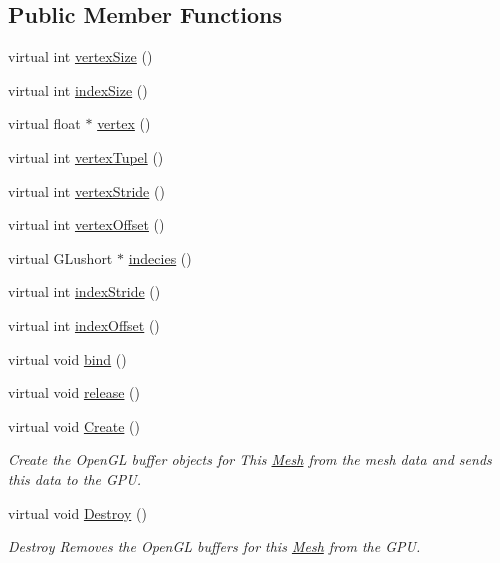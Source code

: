 \subsection*{Public Member Functions}
\begin{DoxyCompactItemize}
\item 
virtual int \hyperlink{class_mesh_a525d8b7c9ff840a0a92c507f0ff2febf}{vertex\+Size} ()
\item 
virtual int \hyperlink{class_mesh_a93afbbcbeaa686dc6a4ae342e842f530}{index\+Size} ()
\item 
virtual float $\ast$ \hyperlink{class_mesh_a7086a32bd045e773e636da12e4f9c1b4}{vertex} ()
\item 
virtual int \hyperlink{class_mesh_a112080d5664bb21790632b7bfcafb4f4}{vertex\+Tupel} ()
\item 
virtual int \hyperlink{class_mesh_abf79b0e9fff121f85f6b2163e8c053f9}{vertex\+Stride} ()
\item 
virtual int \hyperlink{class_mesh_a999026dae1d89c13f5e27a886271d028}{vertex\+Offset} ()
\item 
virtual G\+Lushort $\ast$ \hyperlink{class_mesh_a85b1d83752f168ff75d8327e5dd89df4}{indecies} ()
\item 
virtual int \hyperlink{class_mesh_a1ad488fd8f2d6395f645a127273f0a90}{index\+Stride} ()
\item 
virtual int \hyperlink{class_mesh_abdf32aa39510ff70e9a1d23daebe0c43}{index\+Offset} ()
\item 
virtual void \hyperlink{class_mesh_a8fe3f7dd50c087fe472c0b75ba423974}{bind} ()
\item 
virtual void \hyperlink{class_mesh_a747251d7e9e44fcd7bfd58a89bba7e61}{release} ()
\item 
virtual void \hyperlink{class_mesh_a4e113d785d96bb8b36695469f4c5d862}{Create} ()
\begin{DoxyCompactList}\small\item\em Create the Open\+G\+L buffer objects for This \hyperlink{class_mesh}{Mesh} from the mesh data and sends this data to the G\+P\+U. \end{DoxyCompactList}\item 
virtual void \hyperlink{class_mesh_a969df8ef15def20cfc48c265d194b3c2}{Destroy} ()
\begin{DoxyCompactList}\small\item\em Destroy Removes the Open\+G\+L buffers for this \hyperlink{class_mesh}{Mesh} from the G\+P\+U. \end{DoxyCompactList}\end{DoxyCompactItemize}
